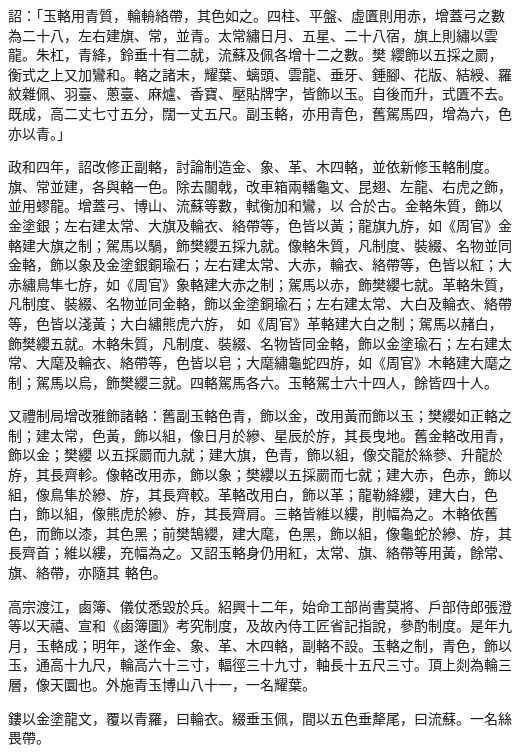 \begin{pinyinscope}
 詔：「玉輅用青質，輪輈絡帶，其色如之。四柱、平盤、虛匱則用赤，增蓋弓之數為二十八，左右建旗、常，並青。太常繡日月、五星、二十八宿，旗上則繡以雲龍。朱杠，青絳，鈴垂十有二就，流蘇及佩各增十二之數。樊
 纓飾以五採之罽，衡式之上又加鸞和。輅之諸末，耀葉、螭頭、雲龍、垂牙、錘腳、花版、結綬、羅紋雜佩、羽臺、蔥臺、麻爐、香寶、壓貼牌字，皆飾以玉。自後而升，式匱不去。既成，高二丈七寸五分，闊一丈五尺。副玉輅，亦用青色，舊駕馬四，增為六，色亦以青。」



 政和四年，詔改修正副輅，討論制造金、象、革、木四輅，並依新修玉輅制度。旗、常並建，各與輅一色。除去闟戟，改車箱兩轓龜文、昆翅、左龍、右虎之飾，並用蟉龍。增蓋弓、博山、流蘇等數，軾衡加和鸞，以
 合於古。金輅朱質，飾以金塗銀；左右建太常、大旗及輪衣、絡帶等，色皆以黃；龍旗九斿，如《周官》金輅建大旗之制；駕馬以騧，飾樊纓五採九就。像輅朱質，凡制度、裝綴、名物並同金輅，飾以象及金塗銀銅瑜石；左右建太常、大赤，輪衣、絡帶等，色皆以紅；大赤繡鳥隼七斿，如《周官》象輅建大赤之制；駕馬以赤，飾樊纓七就。革輅朱質，凡制度、裝綴、名物並同金輅，飾以金塗銅瑜石；左右建太常、大白及輪衣、絡帶等，色皆以淺黃；大白繡熊虎六斿，
 如《周官》革輅建大白之制；駕馬以赭白，飾樊纓五就。木輅朱質，凡制度、裝綴、名物皆同金輅，飾以金塗瑜石；左右建太常、大麾及輪衣、絡帶等，色皆以皂；大麾繡龜蛇四斿，如《周官》木輅建大麾之制；駕馬以烏，飾樊纓三就。四輅駕馬各六。玉輅駕士六十四人，餘皆四十人。



 又禮制局增改雅飾諸輅：舊副玉輅色青，飾以金，改用黃而飾以玉；樊纓如正輅之制；建太常，色黃，飾以組，像日月於縿、星辰於斿，其長曳地。舊金輅改用青，飾以金；樊纓
 以五採罽而九就；建大旗，色青，飾以組，像交龍於絲參、升龍於斿，其長齊軫。像輅改用赤，飾以象；樊纓以五採罽而七就；建大赤，色赤，飾以組，像鳥隼於縿、斿，其長齊較。革輅改用白，飾以革；龍勒絳纓，建大白，色白，飾以組，像熊虎於縿、斿，其長齊肩。三輅皆維以縷，削幅為之。木輅依舊色，而飾以漆，其色黑；前樊鵠纓，建大麾，色黑，飾以組，像龜蛇於縿、斿，其長齊首；維以縷，充幅為之。又詔玉輅身仍用紅，太常、旗、絡帶等用黃，餘常、旗、絡帶，亦隨其
 輅色。



 高宗渡江，鹵簿、儀仗悉毀於兵。紹興十二年，始命工部尚書莫將、戶部侍郎張澄等以天禧、宣和《鹵簿圖》考究制度，及故內侍工匠省記指說，參酌制度。是年九月，玉輅成；明年，遂作金、象、革、木四輅，副輅不設。玉輅之制，青色，飾以玉，通高十九尺，輪高六十三寸，輻徑三十九寸，軸長十五尺三寸。頂上剡為輪三層，像天圜也。外施青玉博山八十一，一名耀葉。



 鏤以金塗龍文，覆以青羅，曰輪衣。綴垂玉佩，間以五色垂犛尾，曰流蘇。一名絲畏帶。




\end{pinyinscope}
